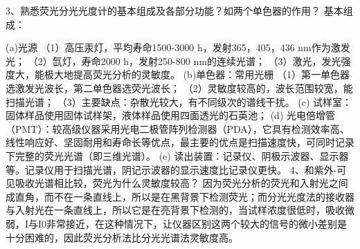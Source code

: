 3、熟悉荧光分光光度计的基本组成及各部分功能？如两个单色器的作用？
基本组成： 

(a)光源
（1）高压汞灯，平均寿命1500-3000 h，发射365，405，436 nm作为激发光；
（2）氙灯，寿命2000 h，发射250-800 nm的连续光谱；
（3）激光，发光强度大，能极大地提高荧光分析的灵敏度。
(b)单色器：常用光栅
（1）第一单色器选激发光波长，第二单色器选荧光波长；
（2）灵敏度较高的，波长范围较宽，能扫描光谱；
（3）主要缺点：杂散光较大，有不同级次的谱线干扰。
(c) 试样室：固体样品使用固体试样架，液体样品使用四面透光的石英池；
(d) 光电倍增管（PMT）：较高级仪器采用光电二极管阵列检测器（PDA），它具有检测效率高、线性响应好、坚固耐用和寿命长等优点，最主要的优点是扫描速度快，可同时记录下完整的荧光光谱（即三维光谱）。
(e) 读出装置：记录仪、阴极示波器、显示器等。记录仪用于扫描光谱，阴记示波器的显示速度比记录仪更快。
4、和紫外-可见吸收光谱相比较，荧光为什么灵敏度较高？
因为荧光分析的荧光和入射光之间成直角，而不在一条直线上，所以是在黑背景下检测荧光；而分光光度法的接收器与入射光在一条直线上，所以它是在亮背景下检测的，当试样浓度很低时，吸收微弱，I与I0非常接近，在这种情况下，让仪器区别这两个较大的信号的微小差别是十分困难的，因此荧光分析法比分光光谱法灵敏度高。